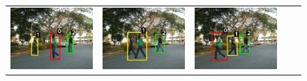 \begin{figure}[t]
  \begin{center}
    \begin{tabular}{ccccc}
      \includegraphics[scale=0.21]{figures/normal-tracking-result-0090.pdf} &
      \includegraphics[scale=0.21]{figures/normal-tracking-result-0094.pdf} &
      \includegraphics[scale=0.21]{figures/normal-tracking-result-0103.pdf} &

\end{tabular}
\end{center}
\end{figure}
